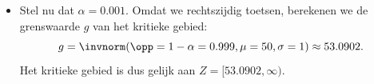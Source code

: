 \begin{enumerate}[label=(\alph*)]
{\begin{itemize}
            \item Stel nu dat $\alpha = 0.001$.
            Omdat we rechtszijdig toetsen, berekenen we de grenswaarde $g$ van het kritieke gebied:
            \[
                g = \invnorm(\opp=1-\alpha=0.999, \mu=50, \sigma=1) \approx 53.0902.
            \]
            Het kritieke gebied is dus gelijk aan $Z = [53.0902, \infty)$.
        \end{itemize} 
    }   
\end{enumerate}